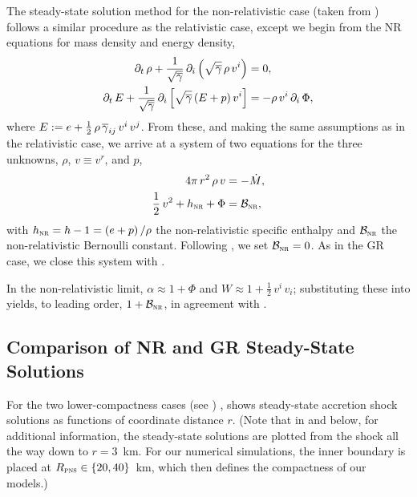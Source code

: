The steady-state solution method for the non-relativistic case
(taken from \citet{bmd2003}) follows a similar procedure
as the relativistic case,
except we begin from the NR equations for mass density and energy density,
\begin{align}
  \partial_{t}\,\rho+\frac{1}{\sqrt{\overline{\gamma}}}\,
  \partial_{i}\left(\sqrt{\overline{\gamma}}\,\rho\,v^{i}\right)
  &=0,\\
  \partial_{t}\,E+\frac{1}{\sqrt{\overline{\gamma}}}\,
  \partial_{i}\left[\sqrt{\overline{\gamma}}\left(E+p\right)v^{i}\right]
  &=-\rho\,v^{i}\,\partial_{i}\,\Phi,
\end{align}
where $E:=e+\frac{1}{2}\,\rho\,\overline{\gamma}_{ij}\,v^{i}\,v^{j}$.
From these, and making the same assumptions as in the relativistic case,
we arrive at a system of two equations for the three unknowns,
$\rho$, $v\equiv v^{r}$, and $p$,
\begin{align}
  4\pi\,r^{2}\,\rho\,v&=-\dot{M},\label{eq.AP.MassConservationNR}\\
  \frac{1}{2}\,v^{2}+h_{\textsc{nr}}+\Phi&=\mathcal{B}_{\textsc{nr}},
  \label{eq.AP.BernoulliNR}
\end{align}
with $h_{\textsc{nr}}=h-1=\left(e+p\right)/\rho$
the non-relativistic specific enthalpy and $\mathcal{B}_{\textsc{nr}}$
the non-relativistic Bernoulli constant.
Following \citet{bmd2003}, we set $\mathcal{B}_{\textsc{nr}}=0$.
As in the GR case, we close this system with .

In the non-relativistic limit,
$\alpha\approx1+\Phi$ and $W\approx1+\frac{1}{2}\,v^{i}\,v_{i}$;
substituting these into  yields, to leading order,
$1+\mathcal{B}_{\textsc{nr}}$,
in agreement with .

\subsection{Comparison of NR and GR Steady-State Solutions}

For the two lower-compactness cases (see )
\citep[e.g., see][]{bmh2013,mjm2015,brv2020},
 shows steady-state accretion shock solutions
as functions of coordinate distance $r$.
(Note that in  and  below,
for additional information, the steady-state solutions are plotted from the shock all
the way down to $r=3$~km.
For our numerical simulations, the inner boundary is placed at
$R_{\textsc{pns}}\in\{20,40\}$~km, which then defines the compactness of our models.)

